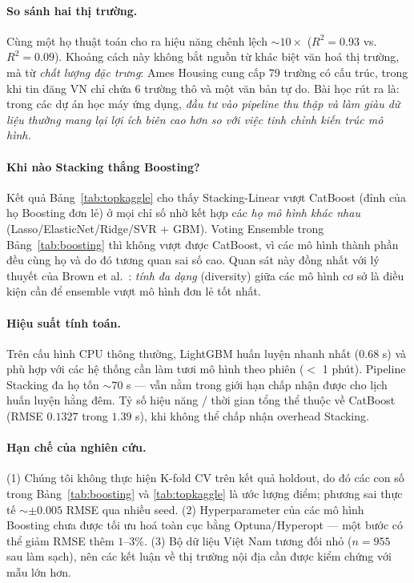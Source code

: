 \documentclass[sigconf,nonacm]{acmart}
\begin{document}
\paragraph{So sánh hai thị trường.}
Cùng một họ thuật toán cho ra hiệu năng chênh lệch ${\sim}10\times$
($R^2 = 0.93$ vs.\ $R^2 = 0.09$). Khoảng cách này không bắt nguồn từ
khác biệt văn hoá thị trường, mà từ \emph{chất lượng đặc trưng}: Ames
Housing cung cấp 79 trường có cấu trúc, trong khi tin đăng VN chỉ
chứa 6 trường thô và một văn bản tự do. Bài học rút ra là: trong các
dự án học máy ứng dụng, \emph{đầu tư vào pipeline thu thập và làm
giàu dữ liệu thường mang lại lợi ích biên cao hơn so với việc tinh
chỉnh kiến trúc mô hình.}

\paragraph{Khi nào Stacking thắng Boosting?}
Kết quả Bảng~\ref{tab:topkaggle} cho thấy Stacking-Linear vượt
CatBoost (đỉnh của họ Boosting đơn lẻ) ở mọi chỉ số nhờ kết hợp các
\emph{họ mô hình khác nhau} (Lasso/ElasticNet/Ridge/SVR + GBM).
Voting Ensemble trong Bảng~\ref{tab:boosting} thì không vượt được
CatBoost, vì các mô hình thành phần đều cùng họ và do đó tương quan
sai số cao. Quan sát này đồng nhất với lý thuyết của Brown et
al.~\cite{brown2005managing}: \emph{tính đa dạng} (diversity) giữa
các mô hình cơ sở là điều kiện cần để ensemble vượt mô hình đơn lẻ
tốt nhất.

\paragraph{Hiệu suất tính toán.}
Trên cấu hình CPU thông thường, LightGBM huấn luyện nhanh nhất
(0.68 s) và phù hợp với các hệ thống cần làm tươi mô hình theo phiên
($<$ 1 phút). Pipeline Stacking đa họ tốn ${\sim}70$ s --- vẫn nằm
trong giới hạn chấp nhận được cho lịch huấn luyện hằng đêm. Tỷ số
hiệu năng / thời gian tổng thể thuộc về CatBoost (RMSE
$0.1327$ trong $1.39$ s), khi không thể chấp nhận overhead Stacking.

\paragraph{Hạn chế của nghiên cứu.}
(1) Chúng tôi không thực hiện K-fold CV trên kết quả holdout, do
đó các con số trong Bảng~\ref{tab:boosting} và \ref{tab:topkaggle}
là ước lượng điểm; phương sai thực tế ${\sim}\pm 0.005$ RMSE qua
nhiều seed. (2) Hyperparameter của các mô hình Boosting chưa được
tối ưu hoá toàn cục bằng Optuna/Hyperopt --- một bước có thể giảm
RMSE thêm $1$--$3\%$. (3) Bộ dữ liệu Việt Nam tương đối nhỏ ($n=955$
sau làm sạch), nên các kết luận về thị trường nội địa cần được kiểm
chứng với mẫu lớn hơn.
\end{document}
